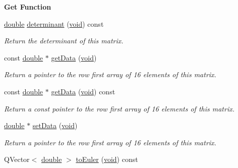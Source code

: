 \begin{Indent}{\bf Get Function}\par
\begin{DoxyCompactItemize}
\item 
\hyperlink{_super_l_u_support_8h_a8956b2b9f49bf918deed98379d159ca7}{double} \hyperlink{class_g_l_c___matrix4x4_a24216203aa88c35db95353eb986790de}{determinant} (\hyperlink{group___u_a_v_objects_plugin_ga444cf2ff3f0ecbe028adce838d373f5c}{void}) const 
\begin{DoxyCompactList}\small\item\em Return the determinant of this matrix. \end{DoxyCompactList}\item 
const \hyperlink{_super_l_u_support_8h_a8956b2b9f49bf918deed98379d159ca7}{double} $\ast$ \hyperlink{class_g_l_c___matrix4x4_aacd80a52605612bce8a6a0dd950e46b6}{get\-Data} (\hyperlink{group___u_a_v_objects_plugin_ga444cf2ff3f0ecbe028adce838d373f5c}{void})
\begin{DoxyCompactList}\small\item\em Return a pointer to the row first array of 16 elements of this matrix. \end{DoxyCompactList}\item 
const \hyperlink{_super_l_u_support_8h_a8956b2b9f49bf918deed98379d159ca7}{double} $\ast$ \hyperlink{class_g_l_c___matrix4x4_a3d5296625daccafc52ac1b3a7e8deae7}{get\-Data} (\hyperlink{group___u_a_v_objects_plugin_ga444cf2ff3f0ecbe028adce838d373f5c}{void}) const 
\begin{DoxyCompactList}\small\item\em Return a const pointer to the row first array of 16 elements of this matrix. \end{DoxyCompactList}\item 
\hyperlink{_super_l_u_support_8h_a8956b2b9f49bf918deed98379d159ca7}{double} $\ast$ \hyperlink{class_g_l_c___matrix4x4_a54e3166e0439e922996eefbe18cf7384}{set\-Data} (\hyperlink{group___u_a_v_objects_plugin_ga444cf2ff3f0ecbe028adce838d373f5c}{void})
\begin{DoxyCompactList}\small\item\em Return a pointer to the row first array of 16 elements of this matrix. \end{DoxyCompactList}\item 
Q\-Vector$<$ \hyperlink{_super_l_u_support_8h_a8956b2b9f49bf918deed98379d159ca7}{double} $>$ \hyperlink{class_g_l_c___matrix4x4_adb251898c1d4f3f897ffed7aab083a60}{to\-Euler} (\hyperlink{group___u_a_v_objects_plugin_ga444cf2ff3f0ecbe028adce838d373f5c}{void}) const 

\end{DoxyCompactItemize}
\end{Indent}
